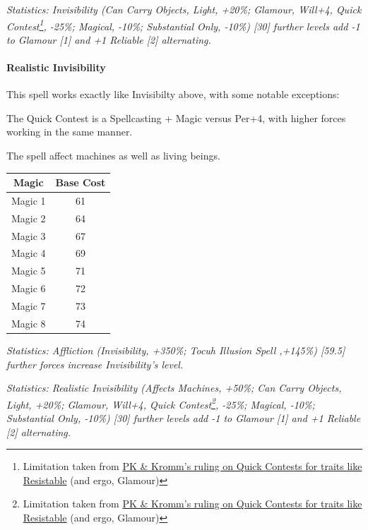 \begin{multicols*}{3}
	\textcolor{OliveGreen}{\textit{Statistics: Invisibility (Can Carry Objects, Light, +20\%; Glamour, Will+4, Quick Contest\footnote{Limitation taken from \textcolor{Blue}{\href{http://forums.sjgames.com/showpost.php?p=669736&postcount=2}{PK \& Kromm's ruling on Quick Contests for traits like Resistable}} (and ergo, Glamour)}, -25\%; Magical, -10\%; Substantial Only, -10\%) [30] further levels add -1 to Glamour [1] and +1 Reliable [2] alternating.}}
	
	\paragraph{Realistic Invisibility}
	
	This spell works exactly like Invisibilty above, with some notable exceptions:
	
	The Quick Contest is a Spellcasting + Magic versus Per+4, with higher forces working in the same manner.
	
	The spell affect machines as well as living beings.
	
	\begin{center}
		\begin{tabular}{|c|c|}
			\hline
			Magic & Base Cost \\
			\hline
			\hline
			Magic 1 & 61\\
			Magic 2 & 64 \\
			Magic 3 & 67 \\
			Magic 4 & 69 \\
			Magic 5 & 71 \\
			Magic 6 & 72 \\
			Magic 7 & 73 \\
			Magic 8 & 74 \\
			\hline
		\end{tabular}
	\end{center}	
	
	\textcolor{OliveGreen}{\textit{Statistics: Affliction (Invisibility, +350\%; Tocuh Illusion Spell ,+145\%) [59.5]  further forces increase Invisibility's level. }}
	
	\textcolor{OliveGreen}{\textit{Statistics: Realistic Invisibility (Affects Machines, +50\%; Can Carry Objects, Light, +20\%; Glamour, Will+4, Quick Contest\footnote{Limitation taken from \textcolor{Blue}{\href{http://forums.sjgames.com/showpost.php?p=669736&postcount=2}{PK \& Kromm's ruling on Quick Contests for traits like Resistable}} (and ergo, Glamour)}, -25\%; Magical, -10\%; Substantial Only, -10\%) [30] further levels add -1 to Glamour [1] and +1 Reliable [2] alternating.}}
	

\end{multicols*}
